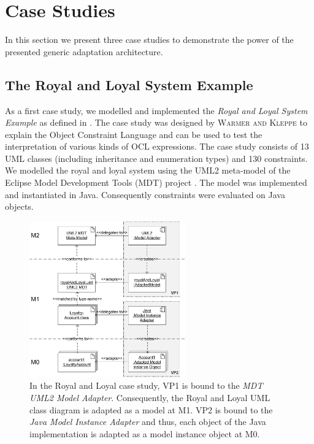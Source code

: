 \section{Case Studies}

In this section we present three case studies to demonstrate the power of the presented
generic adaptation architecture.


\subsection{The Royal and Loyal System Example}

As a first case study, we modelled and implemented the \textit{Royal and Loyal System Example} 
as defined in \cite{warmer:ocl}. The case study was designed by \textsc{Warmer and Kleppe} to explain 
the Object Constraint Language and can be used to test the interpretation of
various kinds of OCL expressions. The case study consists of 13 UML classes (including inheritance and enumeration types)
and 130 constraints. We modelled the royal and loyal system using the UML2 meta-model of the
Eclipse Model Development Tools (MDT) project \cite{WWW:MDT}.
The model was implemented and instantiated in Java. Consequently
constraints were evaluated on Java objects.

\begin{figure}[!t]
	\centering
		\includegraphics[width=0.60\textwidth]{figures/casestudy01.pdf}
	\caption{In the Royal and Loyal case study, VP1 is bound to the \textit{MDT UML2 Model Adapter}. 
	  Consequently, the Royal and Loyal UML class diagram is adapted as a model at M1.
	  VP2 is bound to the \textit{Java Model Instance Adapter} and thus, each object of the Java 
	  implementation is adapted as a model instance object at M0.}
	\label{fig:casestudy01}
\end{figure}

